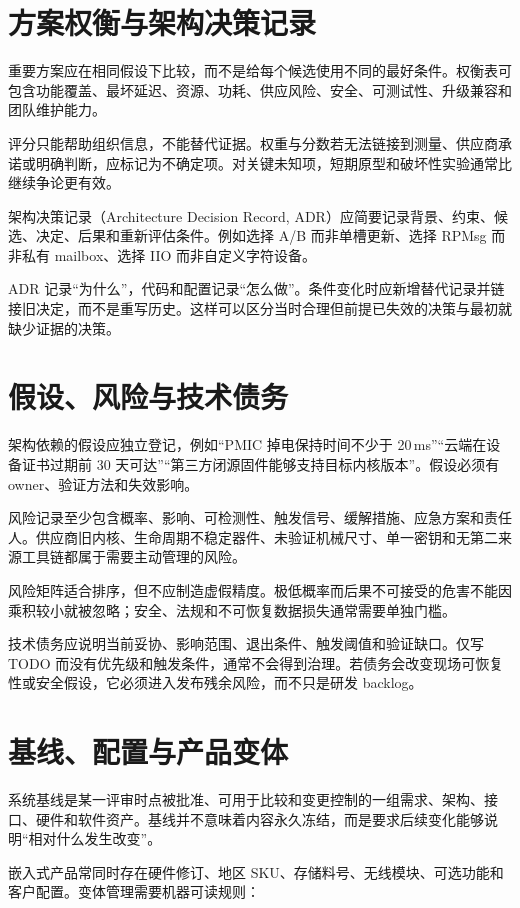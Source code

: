 \section{方案权衡与架构决策记录}

重要方案应在相同假设下比较，而不是给每个候选使用不同的最好条件。权衡表可包含功能覆盖、最坏延迟、资源、功耗、供应风险、安全、可测试性、升级兼容和团队维护能力。

评分只能帮助组织信息，不能替代证据。权重与分数若无法链接到测量、供应商承诺或明确判断，应标记为不确定项。对关键未知项，短期原型和破坏性实验通常比继续争论更有效。

架构决策记录（Architecture Decision Record, ADR）应简要记录背景、约束、候选、决定、后果和重新评估条件。例如选择 A/B 而非单槽更新、选择 RPMsg 而非私有 mailbox、选择 IIO 而非自定义字符设备。

ADR 记录“为什么”，代码和配置记录“怎么做”。条件变化时应新增替代记录并链接旧决定，而不是重写历史。这样可以区分当时合理但前提已失效的决策与最初就缺少证据的决策。

\section{假设、风险与技术债务}

架构依赖的假设应独立登记，例如“PMIC 掉电保持时间不少于 20\,ms”“云端在设备证书过期前 30 天可达”“第三方闭源固件能够支持目标内核版本”。假设必须有 owner、验证方法和失效影响。

风险记录至少包含概率、影响、可检测性、触发信号、缓解措施、应急方案和责任人。供应商旧内核、生命周期不稳定器件、未验证机械尺寸、单一密钥和无第二来源工具链都属于需要主动管理的风险。

风险矩阵适合排序，但不应制造虚假精度。极低概率而后果不可接受的危害不能因乘积较小就被忽略；安全、法规和不可恢复数据损失通常需要单独门槛。

技术债务应说明当前妥协、影响范围、退出条件、触发阈值和验证缺口。仅写 TODO 而没有优先级和触发条件，通常不会得到治理。若债务会改变现场可恢复性或安全假设，它必须进入发布残余风险，而不只是研发 backlog。

\section{基线、配置与产品变体}

系统基线是某一评审时点被批准、可用于比较和变更控制的一组需求、架构、接口、硬件和软件资产。基线并不意味着内容永久冻结，而是要求后续变化能够说明“相对什么发生改变”。

嵌入式产品常同时存在硬件修订、地区 SKU、存储料号、无线模块、可选功能和客户配置。变体管理需要机器可读规则：

